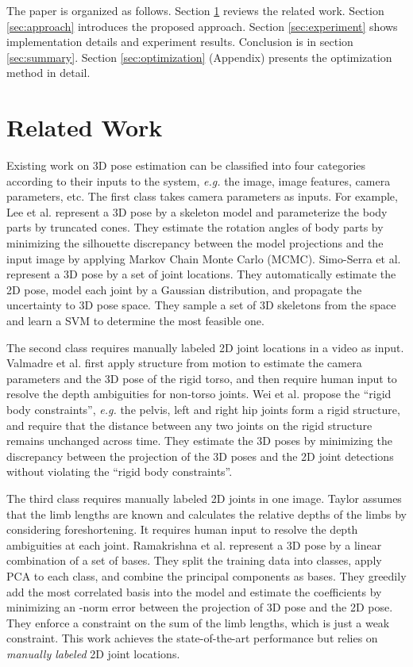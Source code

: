 \documentclass[10pt,twocolumn,letterpaper]{article}
\begin{document}
The paper is organized as follows. Section \ref{sec:relatedwork} reviews the related work. Section \ref{sec:approach} introduces the proposed approach. Section \ref{sec:experiment} shows implementation details and experiment results. Conclusion is in section \ref{sec:summary}. Section \ref{sec:optimization} (Appendix) presents the optimization method in detail.



\section{Related Work}
\label{sec:relatedwork}

Existing work on 3D pose estimation can be classified into four categories according to their inputs to the system, {\it e.g.} the image, image features, camera parameters, etc.
The first class \cite{Lee} \cite{SimoSerraCVPR2012} takes camera parameters as inputs. For example, Lee et al. \cite{Lee}
represent a 3D pose by a skeleton model and parameterize the body
parts by truncated cones. They estimate the rotation angles of body parts by minimizing
the silhouette discrepancy between the model projections and the
input image by applying Markov Chain Monte Carlo
(MCMC). Simo-Serra et al. \cite{SimoSerraCVPR2012} represent
a 3D pose by a set of joint locations. They automatically estimate the 2D pose, model each joint by a Gaussian distribution, and propagate the uncertainty to 3D pose space. They
sample a set of 3D skeletons from the space and learn a SVM to determine the most feasible one.


The second class \cite{c6} \cite{c5} requires manually labeled 2D joint locations in a video as input.
Valmadre et al. \cite{c6} first apply structure from motion to
estimate the camera parameters and the 3D pose of the rigid torso,
and then require human input to resolve the depth ambiguities for
non-torso joints. Wei et al. \cite{c5} propose the ``rigid body
constraints'', {\em e.g.} the pelvis, left and right hip joints form a
rigid structure, and require that the distance between any two joints
on the rigid structure remains unchanged across time. They
estimate the 3D poses by minimizing the discrepancy between the
projection of the 3D poses and the 2D joint detections without violating the
``rigid body constraints''.

The third class \cite{Taylor} \cite{Ramakrishna} requires manually labeled 2D joints in one image. Taylor \cite{Taylor} assumes that the limb lengths are known and calculates the relative depths of the limbs by considering foreshortening. It requires human input to resolve the depth ambiguities at each joint. Ramakrishna et al. \cite{Ramakrishna} represent a 3D pose by a linear combination of a set of bases. They split the
training data into classes, apply PCA to each class, and combine
the principal components as bases. They greedily add the most
correlated basis into the model and estimate the coefficients by
minimizing an -norm error between the projection of 3D pose
and the 2D pose. They enforce a constraint on the sum of the limb
lengths, which is just a weak constraint. This work \cite{Ramakrishna} achieves the state-of-the-art performance but relies on \emph{manually labeled} 2D joint
locations.
\end{document}
